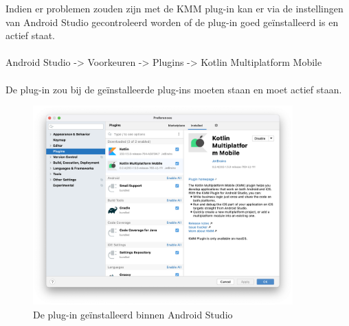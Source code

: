     Indien er problemen zouden zijn met de KMM plug-in kan er via de instellingen van Android Studio gecontroleerd worden of de plug-in goed geïnstalleerd is en actief staat.
    \\ \\
    Android Studio -> Voorkeuren -> Plugins -> Kotlin Multiplatform Mobile
    \\ \\
    De plug-in zou bij de geïnstalleerde plug-ins moeten staan en moet actief staan.
    \begin{figure}
        \centering
        \includegraphics[width=10cm]{img/kmm-plugin-4.png}
        \caption{De plug-in geïnstalleerd binnen Android Studio}
        \label{fig:M-kmm-plugin-4}
    \end{figure}
   
   

